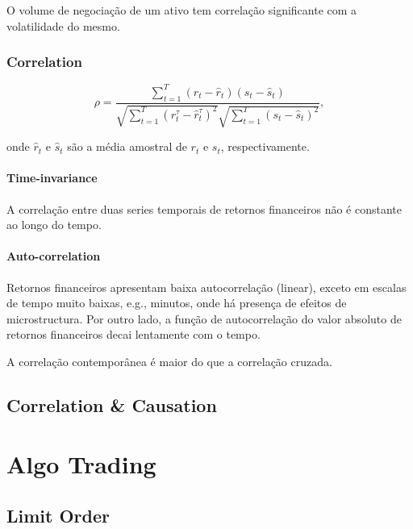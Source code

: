 \documentclass[]{book}
\begin{document}
O volume de negociação de um ativo tem correlação significante com a
volatilidade do mesmo.

\section{Correlation}\label{correlation}

\begin{equation}
\label{eq:correlation}
\rho = \frac{\sum\limits_{t=1}^{T} (r_t - \hat{r}_t)(s_t - \hat{s}_t)}{\sqrt{\sum\limits_{t=1}^{T} (r_t^{\tau} - \hat{r}_t^{\tau})^2}\sqrt{\sum\limits_{t=1}^{T}(s_t - \hat{s}_t)^2}},
\end{equation}

onde \(\hat{r}_t\) e \(\hat{s}_t\) são a média amostral de \(r_t\) e
\(s_t\), respectivamente.

\subsection{Time-invariance}\label{time-invariance-1}

A correlação entre duas series temporais de retornos financeiros não é
constante ao longo do tempo.

\subsection{Auto-correlation}\label{auto-correlation}

Retornos financeiros apresentam baixa autocorrelação (linear), exceto em
escalas de tempo muito baixas, e.g., minutos, onde há presença de
efeitos de microstructura. Por outro lado, a função de autocorrelação do
valor absoluto de retornos financeiros decai lentamente com o tempo.

A correlação contemporânea é maior do que a correlação cruzada.

\chapter{Correlation \& Causation}\label{correlation-causation}

\part{Algo Trading}\label{part-algo-trading}

\chapter{Limit Order}\label{limit-order}
\end{document}
